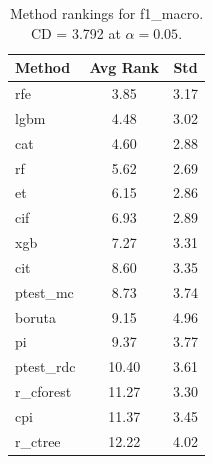 \begin{table}[h]
\centering
\caption{Method rankings for f1_macro. CD = 3.792 at $\alpha=0.05$.}
\label{tab:ranks_f1_macro}
\begin{tabular}{lcc}
\toprule
Method & Avg Rank & Std \\
\midrule
rfe & 3.85 & 3.17 \\
lgbm & 4.48 & 3.02 \\
cat & 4.60 & 2.88 \\
rf & 5.62 & 2.69 \\
et & 6.15 & 2.86 \\
cif & 6.93 & 2.89 \\
xgb & 7.27 & 3.31 \\
cit & 8.60 & 3.35 \\
ptest_mc & 8.73 & 3.74 \\
boruta & 9.15 & 4.96 \\
pi & 9.37 & 3.77 \\
ptest_rdc & 10.40 & 3.61 \\
r_cforest & 11.27 & 3.30 \\
cpi & 11.37 & 3.45 \\
r_ctree & 12.22 & 4.02 \\
\bottomrule
\end{tabular}
\end{table}